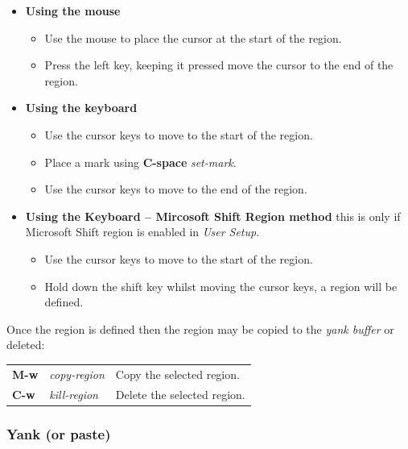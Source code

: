 \documentclass[11pt,a4paper,pdftex]{article}
\begin{document}
  \begin{itemize}

    \item \textbf{Using the mouse}
    \begin{itemize}
      \item Use the mouse to place the cursor at the start of the region.
      \item Press the left key, keeping it pressed move the cursor to the end
      of the region.
    \end{itemize}

    \item \textbf{Using the keyboard}
    \begin{itemize}
      \item Use the cursor keys to move to the start of the region.
      \item Place a mark using \textbf{C-space} \textit{set-mark}.
      \item Use the cursor keys to move to the end of the region.
    \end{itemize}

    \item \textbf{Using the Keyboard -- Mircosoft Shift Region method} this is
    only if Microsoft Shift region is enabled in \textit{User Setup}.

    \begin{itemize}
      \item Use the cursor keys to move to the start of the region.
      \item Hold down the shift key whilst moving the cursor keys, a region
      will be defined.
    \end{itemize}
  \end{itemize}

  Once the region is defined then the region may be copied to the \textit{yank
  buffer} or deleted:

  \begin{longtable}{ll@{\ --\ }l}
    \endhead
    \endfoot
    \endlastfoot
    \textbf{M-w} & \textit{copy-region} &
    Copy the selected region.\\
    \textbf{C-w} & \textit{kill-region} &
    Delete the selected region.\\
  \end{longtable}

\subsubsection{Yank (or paste)}
\end{document}
